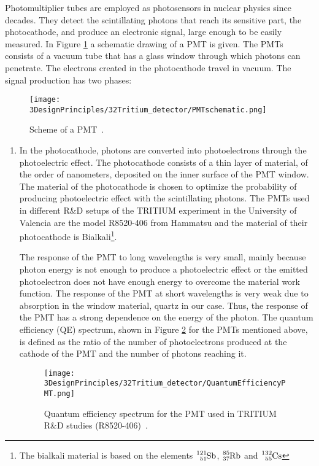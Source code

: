 Photomultiplier tubes are employed as photosensors in nuclear physics since decades. They detect the scintillating photons that reach its sensitive part, the photocathode, and produce an electronic signal, large enough to be easily measured. In Figure \ref{fig:SchemePMT} a schematic drawing of a PMT is given. The PMTs consists of a vacuum tube that has a glass window through which photons can penetrate. The electrons created in the photocathode travel in vacuum. The signal production has two phases:

\begin{figure}[htbp]
\centering
\texttt{[image: 3DesignPrinciples/32Tritium\_detector/PMTschematic.png]}
\caption{Scheme of a PMT\label{fig:SchemePMT}~\cite{Knoll}.}
\end{figure}

\begin{enumerate}
\item{} In the photocathode, photons are converted into photoelectrons through the photoelectric effect. The photocathode consists of a thin layer of material, of the order of nanometers, deposited on the inner surface of the PMT window. The material of the photocathode is chosen to optimize the probability of producing photoelectric effect with the scintillating photons. The PMTs used in different R\&D setups of the TRITIUM experiment in the University of Valencia are the model R8520-406 from Hammatsu \cite{DataSheetPMTs} and the material of their photocathode is Bialkali\footnote{The bialkali material is based on the elements $\ce{^{121}_{51}Sb}$, $\ce{^{85}_{37}Rb}$ and $\ce{^{132}_{55}Cs}$}.

The response of the PMT to long wavelengths is very small, mainly because photon energy is not enough to produce a photoelectric effect or the emitted photoelectron does not have enough energy to overcome the material work function. The response of the PMT at short wavelengths is very weak due to absorption in the window material, quartz in our case. Thus, the response of the PMT has a strong dependence on the energy of the photon. The quantum efficiency (QE)  spectrum, shown in Figure \ref{fig:QuantumEfficiencyPMT} for the PMTs mentioned above, is defined as the ratio of the number of photoelectrons produced at the cathode of the PMT and the number of photons reaching it.

\begin{figure}[htbp]
\centering
\texttt{[image: 3DesignPrinciples/32Tritium\_detector/QuantumEfficiencyPMT.png]}
\caption{Quantum efficiency spectrum for the PMT used in TRITIUM R\&D studies (R8520-406)\label{fig:QuantumEfficiencyPMT}~\cite{DataSheetPMTs}.}
\end{figure}


\end{enumerate}
